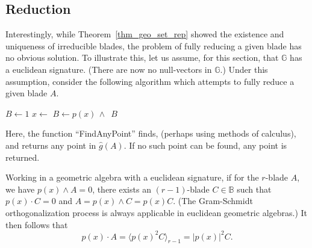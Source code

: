 \documentclass{birkjour}
\newtheorem{lem}[thm]{Lemma}
\theoremstyle{definition}
\theoremstyle{remark}
\numberwithin{equation}{section}
\newcommand{\R}{\mathbb{R}}
\newcommand{\B}{\mathbb{B}}
\newcommand{\G}{\mathbb{G}}
\newcommand{\gh}{\hat{g}}
\begin{document}

\subsection{Reduction}

Interestingly, while Theorem~\ref{thm_geo_set_rep} showed the existence and uniqueness of irreducible blades,
the problem of fully reducing a given blade has no obvious solution.  To illustrate this, let us assume, for this section,
that $\G$ has a euclidean signature.
(There are now no null-vectors in $\G$.)  Under this assumption, consider the following algorithm which
attempts to fully reduce a given blade $A$.

\begin{algorithmic}
	\State $B\gets 1$
	\State $x\gets$
		\State $B\gets p(x)\,\wedge\,$
	\EndIf
	\State\Return $B$
\EndFunction
\end{algorithmic}
Here, the function ``FindAnyPoint'' finds, (perhaps using methods of calculus), and returns any point in $\gh(A)$.
If no such point can be found, any point is returned.

Working in a geometric algebra with a euclidean signature, if for the $r$-blade $A$, we have $p(x)\wedge A=0$,
there exists an $(r-1)$-blade $C\in\B$ such that $p(x)\cdot C=0$ and $A=p(x)\wedge C=p(x)C$.  (The
Gram-Schmidt orthogonalization process is always applicable in euclidean geometric algebras.)
It then follows that
\begin{equation}
p(x)\cdot A = \langle p(x)^2 C\rangle_{r-1}=|p(x)|^2 C.
\end{equation}
\end{document}
